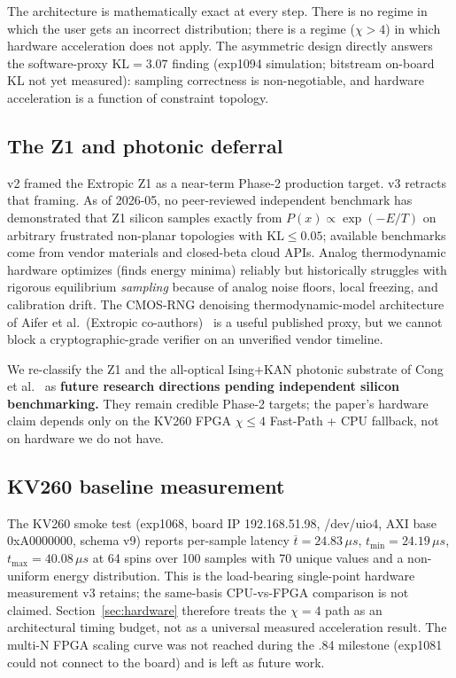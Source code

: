 \documentclass[10pt]{article}
\begin{document}
The architecture is mathematically exact at every step. There is
no regime in which the user gets an incorrect distribution; there
is a regime ($\chi > 4$) in which hardware acceleration does not apply.
The asymmetric design directly answers the software-proxy
$\mathrm{KL} = 3.07$ finding (exp1094 simulation; bitstream on-board
KL not yet measured): sampling correctness is non-negotiable, and
hardware acceleration is a function of constraint topology.

\subsection{The Z1 and photonic deferral}

v2 framed the Extropic Z1 as a near-term Phase-2 production target.
v3 retracts that framing. As of 2026-05, no peer-reviewed independent
benchmark has demonstrated that Z1 silicon samples exactly from
$P(x) \propto \exp(-E/T)$ on arbitrary frustrated non-planar
topologies with $\mathrm{KL} \leq 0.05$; available benchmarks come
from vendor materials and closed-beta cloud APIs. Analog
thermodynamic hardware optimizes (finds energy minima) reliably but
historically struggles with rigorous equilibrium \emph{sampling}
because of analog noise floors, local freezing, and calibration
drift. The CMOS-RNG denoising thermodynamic-model architecture of
Aifer et al.\ (Extropic co-authors)~\cite{aifer2025efficient} is a
useful published proxy, but we cannot block a cryptographic-grade
verifier on an unverified vendor timeline.

We re-classify the Z1 and the all-optical Ising+KAN photonic
substrate of Cong et al.~\cite{cong2025programmable} as
\textbf{future research directions pending independent silicon
benchmarking.} They remain credible Phase-2 targets; the paper's
hardware claim depends only on the KV260 FPGA $\chi \leq 4$
Fast-Path + CPU fallback, not on hardware we do not have.

\subsection{KV260 baseline measurement}

The KV260 smoke test (exp1068, board IP 192.168.51.98, /dev/uio4,
AXI base 0xA0000000, schema v9) reports per-sample latency
$\overline{t} = 24.83\,\mu s$, $t_{\min} = 24.19\,\mu s$,
$t_{\max} = 40.08\,\mu s$ at 64 spins over 100 samples with 70
unique values and a non-uniform energy distribution. This is the
load-bearing single-point hardware measurement v3 retains; the
same-basis CPU-vs-FPGA comparison is not claimed. Section~\ref{sec:hardware}
therefore treats the $\chi = 4$ path as an architectural timing
budget, not as a universal measured acceleration result. The multi-N
FPGA scaling curve was not reached during the .84 milestone (exp1081
could not connect to the board) and is left as future work.
\end{document}
